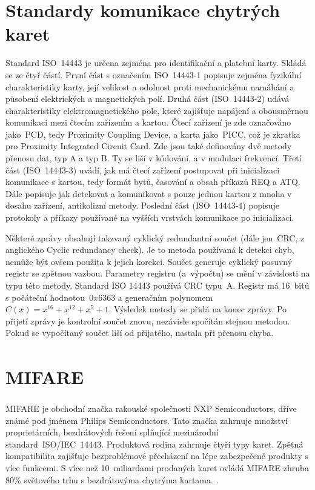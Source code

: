 \section{Standardy komunikace chytrých karet}
Standard ISO~14443 je určena zejména pro identifikační a platební karty. Skládá se ze čtyř částí. První část s označením {ISO~14443-1} popisuje zejména fyzikální charakteristiky karty, její velikost a odolnost proti mechanickému namáhání a působení elektrických a magnetických polí. Druhá část ({ISO~14443-2}) udává charakteristiky elektromagnetického pole, které zajišťuje napájení a obousměrnou komunikaci mezi čtecím zařízením a kartou. Čtecí zařízení je zde označováno jako~PCD, tedy Proximity Coupling Device, a karta jako~PICC, což je zkratka pro Proximity Integrated Circuit Card. Zde jsou také definovány dvě metody přenosu dat, typ A a typ B. Ty se liší v kódování, a v modulaci frekvencí. Třetí část ({ISO~14443-3}) uvádí, jak má čtecí zařízení postupovat při inicializaci komunikace s kartou, tedy formát bytů, časování a obsah příkazů REQ a ATQ. Dále popisuje jak detekovat a komunikovat s pouze jednou kartou z mnoha v dosahu zařízení, antikolizní metody. Poslední část ({ISO~14443-4})  popisuje protokoly a příkazy používané na vyšších vrstvách komunikace po inicializaci\cite{ISO14443}.
\par
Některé zprávy obsahují takzvaný cyklický redundantní součet (dále jen~CRC, z anglického Cyclic redundancy check). Je to metoda používaná k detekci chyb, nemůže být ovšem použita k jejich korekci. Součet generuje cyklický posuvný registr se zpětnou vazbou. Parametry registru (a~výpočtu) se mění v závislosti na typu této metody. Standard ISO 14443 používá CRC typu~A. Registr má 16~bitů s počáteční hodnotou~$0x6363$ a generačním polynomem $C(x) = x^{16} + x^{12} + x^5 + 1$. Výsledek metody se přidá na konec zprávy. Po přijetí zprávy je kontrolní součet znovu, nezávisle spočítán stejnou metodou. Pokud se vypočítaný součet liší od přijatého, nastala při přenosu chyba\cite{Smart_card_handbook}\cite{ISO14443}.


\section{MIFARE\textsuperscript{\textregistered}}
MIFARE\textsuperscript{\textregistered} je obchodní značka rakouské společnosti NXP Semiconductors, dříve známé pod jménem Philips Semiconductors. Tato značka zahrnuje množství proprietárních, bezdrátových řešení splňující mezinárodní standard~ISO/IEC~14443. Produktová rodina zahrnuje čtyři typy karet. Zpětná kompatibilita zajišťuje bezproblémové přecházení na lépe zabezpečené produkty s více funkcemi. S více než 10~miliardami prodaných karet ovládá MIFARE zhruba 80\% světového trhu s bezdrátovýma chytrýma kartama. 
\cite{About_MIFARE}\cite{Dismantling_Mifare_Classic}.


